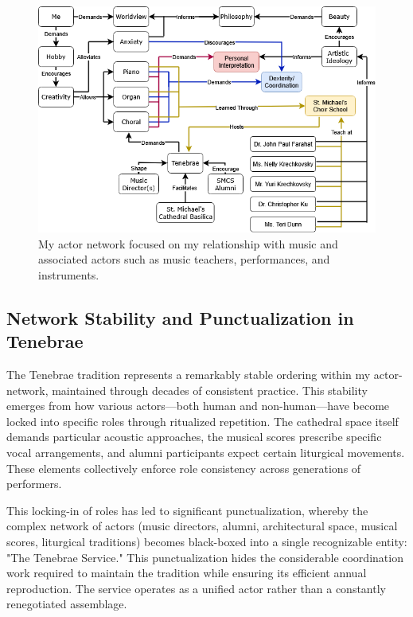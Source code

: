 \documentclass{article} %
\begin{document}
\begin{figure}[h!]            %
  \centering
  \includegraphics[width=0.9\linewidth]{Figs/Actor_Network.png}
  \caption{My actor network focused on my relationship with music and associated actors such as music teachers, performances, and instruments.}
  \label{fig:actor_network}
\end{figure}

\subsection{Network Stability and Punctualization in Tenebrae}

The Tenebrae tradition represents a remarkably stable ordering within my actor-network, maintained through decades of consistent practice. This stability emerges from how various actors—both human and non-human—have become locked into specific roles through ritualized repetition. The cathedral space itself demands particular acoustic approaches, the musical scores prescribe specific vocal arrangements, and alumni participants expect certain liturgical movements. These elements collectively enforce role consistency across generations of performers.

This locking-in of roles has led to significant punctualization, whereby the complex network of actors (music directors, alumni, architectural space, musical scores, liturgical traditions) becomes black-boxed into a single recognizable entity: "The Tenebrae Service." This punctualization hides the considerable coordination work required to maintain the tradition while ensuring its efficient annual reproduction. The service operates as a unified actor rather than a constantly renegotiated assemblage.
\end{document}
